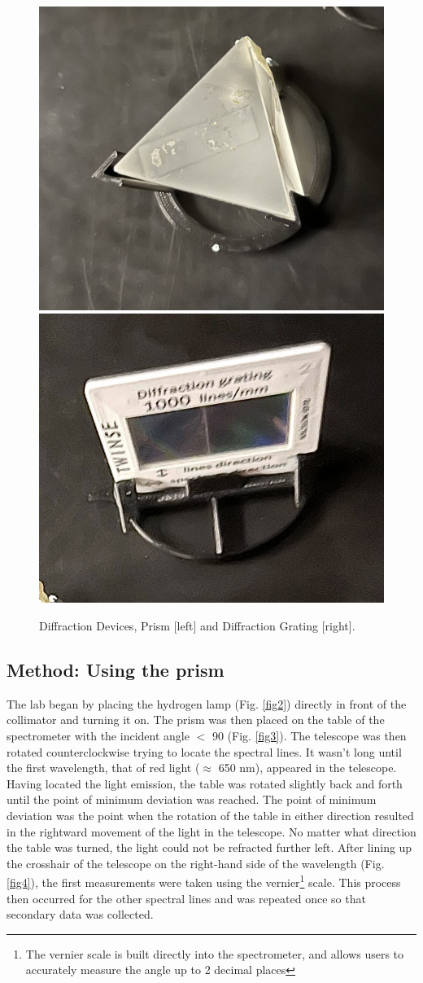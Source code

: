\documentclass[letterpaper,11pt] {article}
\begin{document}
\begin{figure}[H] 
        \centering \includegraphics[width=0.4\columnwidth, height=6\headheight]{H-Spectrum Lab photos/Prism.jpg}
        \centering \includegraphics[width=0.4\columnwidth, height=6\headheight]{H-Spectrum Lab photos/Grating.jpg}
         \caption{\label{fig5}Diffraction Devices, Prism [left] and Diffraction Grating [right].}
\end{figure}



\subsection{Method: Using the prism}

 The lab began by placing the hydrogen lamp (Fig. \ref{fig2}) directly in front of the collimator and turning it on. The prism was then placed on the table of the spectrometer with the incident angle $<$ 90\textdegree\text{} (Fig. \ref{fig3}). The telescope was then rotated counterclockwise trying to locate the spectral lines. It wasn’t long until the first wavelength, that of red light ($\approx$ 650 nm), appeared in the telescope. Having located the light emission, the table was rotated slightly back and forth until the point of minimum deviation was reached. The point of minimum deviation was the point when the rotation of the table in either direction resulted in the rightward movement of the light in the telescope. No matter what direction the table was turned, the light could not be refracted further left. After lining up the crosshair of the telescope on the right-hand side of the wavelength (Fig. \ref{fig4}), the first measurements were taken using the vernier\footnote{The vernier scale is built directly into the spectrometer, and allows users to accurately measure the angle up to 2 decimal places} scale. This process then occurred for the other spectral lines and was repeated once so that secondary data was collected.  
\end{document}
